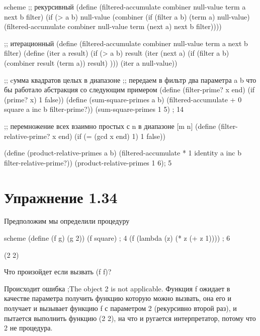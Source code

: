 \begin{codelisting}{scheme}
;; рекурсивный
(define (filtered-accumulate combiner null-value term a next b filter)
  (if (> a b)
      null-value
      (combiner (if (filter a b) (term a) null-value)
                (filtered-accumulate combiner null-value term (next a) next b filter))))

;; итерационный
(define (filtered-accumulate combiner null-value term a next b filter)
  (define (iter a result)
    (if (> a b)
      result
      (iter (next a) (if (filter a b)
                         (combiner result (term a))
                         result)
            )))
  (iter a null-value))


;; cумма квадратов целых в диапазоне
;; передаем в фильтр два параметра a b что бы работало абстракция со следующим примером
(define (filter-prime? x end)
  (if (prime? x)
      1
      false))
(define (sum-square-primes a b)
  (filtered-accumulate + 0 square a inc b filter-prime?))
(sum-square-primes 1 5) ; 14

;; перемножение всех взаимно простых с n в диапазоне [m n]
(define (filter-relative-prime? x end)
  (if (= (gcd x end) 1)
      1
      false))

(define (product-relative-primes a b)
  (filtered-accumulate * 1 identity a inc b filter-relative-prime?))
(product-relative-primes 1 6); 5
\end{codelisting}

\chapter{Упражнение 1.34}

Предположим мы определили процедуру

\begin{codelisting}{scheme}
(define (f g)
  (g 2))
(f square) ; 4
(f (lambda (z) (* z (+ z 1)))) ; 6

(2 2)
\end{codelisting}

Что произойдет если вызвать (f f)?

Происходит ошибка ;The object 2 is not applicable. Функция f ожидает в качестве параметра получить функцию которую можно вызвать, она его и получает и вызывает функцию f с параметром 2 (рекурсивно второй раз), и пытается выполнить функцию (2 2), на что и ругается интерпретатор, потому что 2 не процедура.